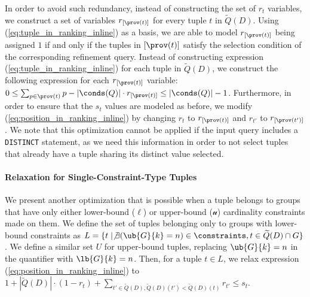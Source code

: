 In order to avoid such redundancy, instead of constructing the set of $r_t$ variables, we construct a set of variables $r_{[\prov(t)]}$ for every tuple $t$ in $\widetilde{Q}(D)$. Using (\ref{eq:tuple_in_ranking_inline}) as a basis, we are able to model $r_{[\prov(t)]}$ being assigned $1$ if and only if the tuples in $[\prov(t)]$ satisfy the selection condition of the corresponding refinement query.
 Instead of constructing expression (\ref{eq:tuple_in_ranking_inline}) for each tuple in $\widetilde{Q}(D)$, we construct the following expression for each $r_{[\prov(t)]}$ variable:
    $0 \leq \sum_{p \in \prov(t)} p - |\conds(Q)| \cdot r_{[\prov(t)]} \leq |\conds(Q)| - 1$.
Furthermore, in order to ensure that the $s_t$ values are modeled as before, we modify (\ref{eq:position_in_ranking_inline}) by changing $r_t$ to $r_{[\prov(t)]}$ and $r_{t'}$ to $r_{[\prov(t')]}$.
We note that this optimization cannot be applied if the input query includes a {\tt DISTINCT} statement,
as we need this information in order to not select tuples that already have a tuple sharing its distinct value selected.



\paragraph*{Relaxation for Single-Constraint-Type Tuples}
We present another optimization that is possible when a tuple belongs to groups that have only either lower-bound ($\ell$) or upper-bound ($\mathscr{u}$) cardinality constraints made on them. We define the set of tuples belonging only to groups with lower-bound constraints as 
$L = \{ t \mid \not\exists (\ub{G}{k} = n) \in \constraints, t \in \widetilde{Q}(D) \cap G \}$.
We define a similar set $U$ for upper-bound tuples, replacing $\ub{G}{k} = n$ in the quantifier with $\lb{G}{k} = n$. Then, for a tuple $t \in L$, we relax expression (\ref{eq:position_in_ranking_inline}) to 
$1 + |\widetilde{Q}(D)| \cdot (1 - r_t) + \sum_{t' \in \widetilde{Q}(D), \widetilde{Q}(D)(t') < \widetilde{Q}(D)(t)} r_{t'} \leq s_{t}$.

